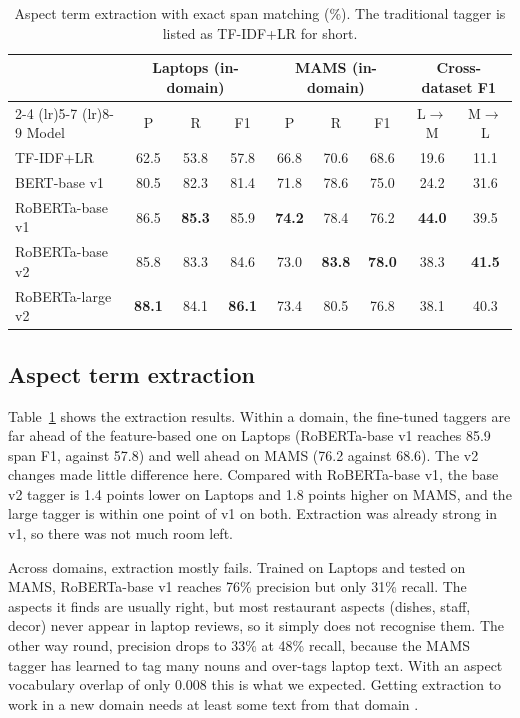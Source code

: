 \documentclass[11pt]{article}
\begin{document}
\begin{table}[t]
\centering
\footnotesize
\begin{tabular}{lcccccccc}
\toprule
 & \multicolumn{3}{c}{Laptops (in-domain)} & \multicolumn{3}{c}{MAMS (in-domain)} & \multicolumn{2}{c}{Cross-dataset F1} \\
\cmidrule(lr){2-4} \cmidrule(lr){5-7} \cmidrule(lr){8-9}
Model & P & R & F1 & P & R & F1 & L$\to$M & M$\to$L \\
\midrule
TF-IDF+LR & 62.5 & 53.8 & 57.8 & 66.8 & 70.6 & 68.6 & 19.6 & 11.1 \\
BERT-base v1 & 80.5 & 82.3 & 81.4 & 71.8 & 78.6 & 75.0 & 24.2 & 31.6 \\
RoBERTa-base v1 & 86.5 & \textbf{85.3} & 85.9 & \textbf{74.2} & 78.4 & 76.2 & \textbf{44.0} & 39.5 \\
\midrule
RoBERTa-base v2 & 85.8 & 83.3 & 84.6 & 73.0 & \textbf{83.8} & \textbf{78.0} & 38.3 & \textbf{41.5} \\
RoBERTa-large v2 & \textbf{88.1} & 84.1 & \textbf{86.1} & 73.4 & 80.5 & 76.8 & 38.1 & 40.3 \\
\bottomrule
\end{tabular}
\caption{Aspect term extraction with exact span matching (\%). The traditional tagger is listed as TF-IDF+LR for short.}
\label{tab:ate}
\end{table}

\subsection{Aspect term extraction}
Table~\ref{tab:ate} shows the extraction results. Within a domain, the fine-tuned taggers are far ahead of the feature-based one on Laptops (RoBERTa-base v1 reaches 85.9 span F1, against 57.8) and well ahead on MAMS (76.2 against 68.6). The v2 changes made little difference here. Compared with RoBERTa-base v1, the base v2 tagger is 1.4 points lower on Laptops and 1.8 points higher on MAMS, and the large tagger is within one point of v1 on both. Extraction was already strong in v1, so there was not much room left.

Across domains, extraction mostly fails. Trained on Laptops and tested on MAMS, RoBERTa-base v1 reaches 76\% precision but only 31\% recall. The aspects it finds are usually right, but most restaurant aspects (dishes, staff, decor) never appear in laptop reviews, so it simply does not recognise them. The other way round, precision drops to 33\% at 48\% recall, because the MAMS tagger has learned to tag many nouns and over-tags laptop text. With an aspect vocabulary overlap of only 0.008 this is what we expected. Getting extraction to work in a new domain needs at least some text from that domain \citep{rietzler2020adapt}.
\end{document}
